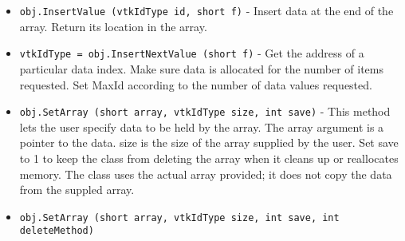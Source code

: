 \begin{itemize}
\item  \verb|obj.InsertValue (vtkIdType id, short f)| -  Insert data at the end of the array. Return its location in the array.

\item  \verb|vtkIdType = obj.InsertNextValue (short f)| -  Get the address of a particular data index. Make sure data is allocated
 for the number of items requested. Set MaxId according to the number of
 data values requested.

\item  \verb|obj.SetArray (short array, vtkIdType size, int save)| -  This method lets the user specify data to be held by the array.  The
 array argument is a pointer to the data.  size is the size of
 the array supplied by the user.  Set save to 1 to keep the class
 from deleting the array when it cleans up or reallocates memory.
 The class uses the actual array provided; it does not copy the data
 from the suppled array. 

\item  \verb|obj.SetArray (short array, vtkIdType size, int save, int deleteMethod)|

\end{itemize}

